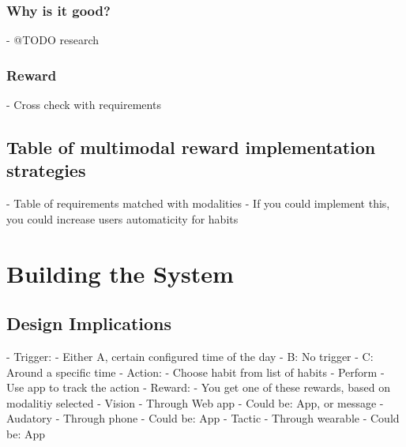     \subsubsection{Why is it good?}
        - @TODO research
    \subsubsection{Reward}
        - Cross check with requirements
  \subsection{Table of multimodal reward implementation strategies}
    - Table of requirements matched with modalities\newline
    - If you could implement this, you could increase users automaticity for habits

\section{Building the System}
  \subsection{Design Implications}
    - Trigger:\newline
        - Either A, certain configured time of the day\newline
        -        B: No trigger\newline
        -        C: Around a specific time\newline
    - Action:\newline
      - Choose habit from list of habits\newline
      - Perform\newline
      - Use app to track the action\newline
    - Reward:\newline
      - You get one of these rewards, based on modalitiy selected\newline
      - Vision\newline
        - Through Web app\newline
        - Could be: App, or message\newline
      - Audatory\newline
        - Through phone\newline
        - Could be: App\newline
      - Tactic\newline
        - Through wearable\newline
        - Could be: App
